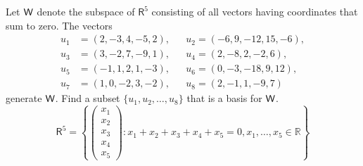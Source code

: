 Let $\mathsf{W}$ denote the subspace of $\mathsf{R}^5$ consisting of all
vectors having coordinates that sum to zero. The vectors
\begin{align*}
u_1 &= (2,-3,4,-5,2), && u_2 = (-6,9,-12,15,-6),\\
u_3 &= (3,-2,7,-9,1), && u_4 = (2,-8,2,-2,6),\\
u_5 &= (-1,1,2,1,-3), && u_6 = (0,-3,-18,9,12),\\
u_7 &= (1,0,-2,3,-2), && u_8 = (2,-1,1,-9,7)
\end{align*}
generate $\mathsf{W}$. Find a subset $\{u_1,u_2,\dotsc,u_8\}$ that is a basis
for $\mathsf{W}$.
\begin{equation}
\mathsf{R}^5 =
\left\{ \begin{pmatrix}x_1\\x_2\\x_3\\x_4\\x_5\end{pmatrix} \colon x_1
  +x_2 +x_3 + x_4 +x_5 =0, x_1,\dotsc,x_5 \in \mathbb{R}\right\}
\end{equation}
